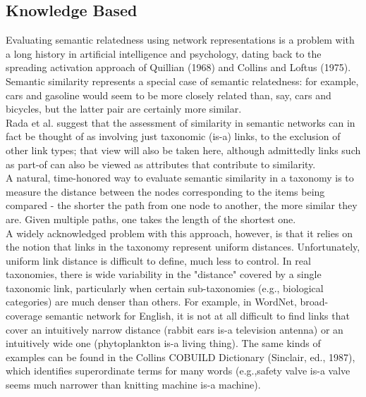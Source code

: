 \subsection{Knowledge Based}
\label {knowledge}
Evaluating semantic relatedness using network representations is a problem with a long history in artificial intelligence and psychology, dating back to the spreading activation approach of Quillian (1968) and Collins and Loftus (1975). Semantic similarity represents a special case of semantic relatedness: for example, cars and gasoline would seem to be more closely related than, say, cars and bicycles, but the latter pair are certainly more similar.\\
Rada et al.\citep{rada1989development} suggest that the assessment of similarity in semantic networks can in fact be thought of as involving just taxonomic (is-a) links, to the exclusion of other link types; that view will also be taken here, although admittedly links such as part-of can also be viewed as attributes that contribute to similarity.\\
    A natural, time-honored way to evaluate semantic similarity in a taxonomy is to measure the distance between the nodes corresponding to the items being compared - the shorter the path from one node to another, the more similar they are. Given multiple paths, one takes the length of the shortest one.\\
    A widely acknowledged problem with this approach, however, is that it relies on the notion that links in the taxonomy represent uniform distances. Unfortunately, uniform link distance is difficult to define, much less to control. In real taxonomies, there is wide variability in the "distance" covered by a single taxonomic link, particularly when certain sub-taxonomies (e.g., biological categories) are much denser than others. For example, in WordNet, broad-coverage semantic network for English, it is not at all difficult to find links that cover an intuitively narrow distance (rabbit ears is-a television antenna) or an intuitively wide one (phytoplankton is-a living thing). The same kinds of examples can be found in the Collins COBUILD Dictionary (Sinclair, ed., 1987), which identifies superordinate terms for many words (e.g.,safety valve is-a valve seems much narrower than knitting machine is-a machine)\citep{semantic_2}.\\

